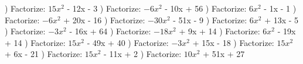 \documentclass{article}%
\begin{document}
\newline%
) Factorize: $15x^2$ - 12x - 3%
\newline%
\newline%
) Factorize: $-6x^2$ - 10x + 56%
\newline%
\newline%
) Factorize: $6x^2$ - 1x - 1%
\newline%
\newline%
) Factorize: $-6x^2$ + 20x - 16%
\newline%
\newline%
) Factorize: $-30x^2$ - 51x - 9%
\newline%
\newline%
) Factorize: $6x^2$ + 13x - 5%
\newline%
\newline%
) Factorize: $-3x^2$ - 16x + 64%
\newline%
\newline%
) Factorize: $-18x^2$ + 9x + 14%
\newline%
\newline%
) Factorize: $6x^2$ - 19x + 14%
\newline%
\newline%
) Factorize: $15x^2$ - 49x + 40%
\newline%
\newline%
) Factorize: $-3x^2$ + 15x - 18%
\newline%
\newline%
) Factorize: $15x^2$ + 6x - 21%
\newline%
\newline%
) Factorize: $15x^2$ - 11x + 2%
\newline%
\newline%
) Factorize: $10x^2$ + 51x + 27%
\newline%
\newline%
\end{document}
